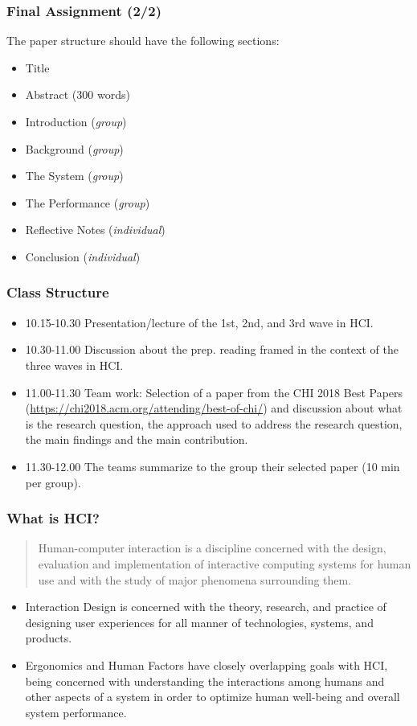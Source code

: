 \documentclass[screen, aspectratio=43]{beamer}
\begin{document}
%
\begin{frame}
\frametitle{Final Assignment (2/2)}
{\small
The paper structure should have the following sections:
\begin{itemize}
\item Title
\item Abstract (300 words)
\item Introduction (\emph{group})
\item Background (\emph{group})
\item The System (\emph{group})
\item The Performance (\emph{group})
\item Reflective Notes (\emph{individual})
\item Conclusion (\emph{individual})
\end{itemize}
}
\end{frame}
%
\begin{frame}
\frametitle{Class Structure}
\begin{itemize}
\item 10.15-10.30 Presentation/lecture of the 1st, 2nd, and 3rd wave in HCI.
\item 10.30-11.00 Discussion about the prep. reading framed in the context of the three waves in HCI.
\item 11.00-11.30 Team work: Selection of a paper from the CHI 2018 Best Papers (\url{https://chi2018.acm.org/attending/best-of-chi/}) and discussion about what is the research question, the approach used to address the research question, the main findings and the main contribution.
\item 11.30-12.00 The teams summarize to the group their selected paper (10 min per group).
\end{itemize}
\end{frame}
%
\begin{frame}
\frametitle{What is HCI?}
\begin{quote}
Human-computer interaction is a discipline concerned with the design, evaluation and implementation of interactive computing systems for human use and with the study of major phenomena surrounding them. \cite{Hewett.1992.curricula}
\end{quote}
\begin{itemize}
\item Interaction Design is concerned with the theory, research, and practice of designing user experiences for all manner of technologies, systems, and products.~\cite{Preece.et.al.2015.ic-book}
\item Ergonomics and Human Factors have closely overlapping goals with HCI, being concerned with understanding the interactions among humans and other aspects of a system in order to optimize human well-being and overall system performance.~\cite{Preece.et.al.2015.ic-book}
\end{itemize}
\end{frame}
\end{document}
